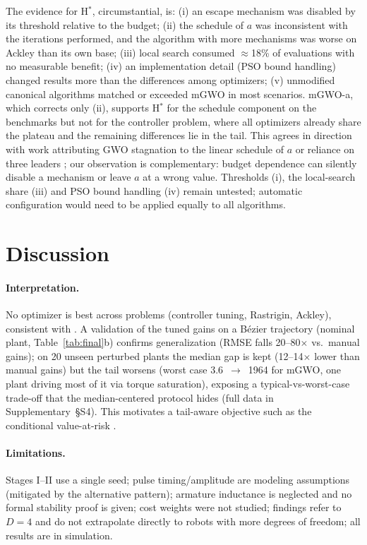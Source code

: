 \documentclass[10pt,journal,compsoc]{IEEEtran}
\newcommand{\mgwo}{mGWO}
\newcommand{\mgwoa}{mGWO-a}
\begin{document}
The evidence for H$^\ast$, circumstantial, is: (i) an escape mechanism was disabled by its threshold relative to the budget; (ii) the schedule of $a$ was inconsistent with the iterations performed, and the algorithm with more mechanisms was worse on Ackley than its own base; (iii) local search consumed $\approx$18\% of evaluations with no measurable benefit; (iv) an implementation detail (PSO bound handling) changed results more than the differences among optimizers; (v) unmodified canonical algorithms matched or exceeded \mgwo{} in most scenarios. \mgwoa{}, which corrects only (ii), supports H$^\ast$ for the schedule component on the benchmarks but not for the controller problem, where all optimizers already share the plateau and the remaining differences lie in the tail. This agrees in direction with work attributing GWO stagnation to the linear schedule of $a$ \cite{li2025} or reliance on three leaders \cite{adegboye2024}; our observation is complementary: budget dependence can silently disable a mechanism or leave $a$ at a wrong value. Thresholds (i), the local-search share (iii) and PSO bound handling (iv) remain untested; automatic configuration \cite{lopez2016} would need to be applied equally to all algorithms.

\section{Discussion}\label{sec:disc}
\paragraph{Interpretation.} No optimizer is best across problems (controller tuning, Rastrigin, Ackley), consistent with \cite{wolpert1997}. A validation of the tuned gains on a B\'ezier trajectory (nominal plant, Table~\ref{tab:final}b) confirms generalization (RMSE falls 20--80$\times$ vs.\ manual gains); on 20 unseen perturbed plants the median gap is kept (12--14$\times$ lower than manual gains) but the tail worsens (worst case 3.6~$\to$~1964 for \mgwo{}, one plant driving most of it via torque saturation), exposing a typical-vs-worst-case trade-off that the median-centered protocol hides (full data in Supplementary~\S S4). This motivates a tail-aware objective such as the conditional value-at-risk \cite{rockafellar2000}.

\paragraph{Limitations.} Stages I--II use a single seed; pulse timing/amplitude are modeling assumptions (mitigated by the alternative pattern); armature inductance is neglected and no formal stability proof is given; cost weights were not studied; findings refer to $D=4$ and do not extrapolate directly to robots with more degrees of freedom; all results are in simulation.
\end{document}
